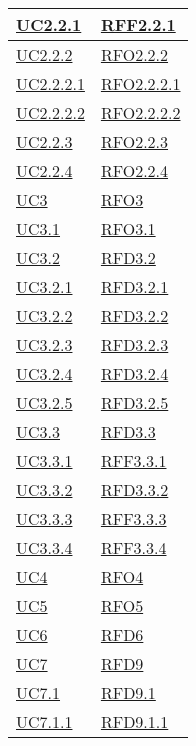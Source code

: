\begin{longtable}{|>{\centering}m{5cm}|m{5cm}<{\centering}|}
\hyperref[UC2.2.1]{UC2.2.1} & \hyperlink{RFF2.2.1}{RFF2.2.1}\\ \hline
\hyperref[UC2.2.2]{UC2.2.2} & \hyperlink{RFO2.2.2}{RFO2.2.2}\\ \hline
\hyperref[UC2.2.2.1]{UC2.2.2.1} & \hyperlink{RFO2.2.2.1}{RFO2.2.2.1}\\ \hline
\hyperref[UC2.2.2.2]{UC2.2.2.2} & \hyperlink{RFO2.2.2.2}{RFO2.2.2.2}\\ \hline
\hyperref[UC2.2.3]{UC2.2.3} & \hyperlink{RFO2.2.3}{RFO2.2.3}\\ \hline
\hyperref[UC2.2.4]{UC2.2.4} & \hyperlink{RFO2.2.4}{RFO2.2.4}\\ \hline
\hyperref[UC3]{UC3} & \hyperlink{RFO3}{RFO3}\\ \hline
\hyperref[UC3.1]{UC3.1} & \hyperlink{RFO3.1}{RFO3.1}\\ \hline
\hyperref[UC3.2]{UC3.2} & \hyperlink{RFD3.2}{RFD3.2}\\ \hline
\hyperref[UC3.2.1]{UC3.2.1} & \hyperlink{RFD3.2.1}{RFD3.2.1}\\ \hline
\hyperref[UC3.2.2]{UC3.2.2} & \hyperlink{RFD3.2.2}{RFD3.2.2}\\ \hline
\hyperref[UC3.2.3]{UC3.2.3} & \hyperlink{RFD3.2.3}{RFD3.2.3}\\ \hline
\hyperref[UC3.2.4]{UC3.2.4} & \hyperlink{RFD3.2.4}{RFD3.2.4}\\ \hline
\hyperref[UC3.2.5]{UC3.2.5} & \hyperlink{RFD3.2.5}{RFD3.2.5}\\ \hline
\hyperref[UC3.3]{UC3.3} & \hyperlink{RFD3.3}{RFD3.3}\\ \hline
\hyperref[UC3.3.1]{UC3.3.1} & \hyperlink{RFF3.3.1}{RFF3.3.1}\\ \hline
\hyperref[UC3.3.2]{UC3.3.2} & \hyperlink{RFD3.3.2}{RFD3.3.2}\\ \hline
\hyperref[UC3.3.3]{UC3.3.3} & \hyperlink{RFF3.3.3}{RFF3.3.3}\\ \hline
\hyperref[UC3.3.4]{UC3.3.4} & \hyperlink{RFF3.3.4}{RFF3.3.4}\\ \hline
\hyperref[UC4]{UC4} & \hyperlink{RFO4}{RFO4}\\ \hline
\hyperref[UC5]{UC5} & \hyperlink{RFO5}{RFO5}\\ \hline
\hyperref[UC6]{UC6} & \hyperlink{RFD6}{RFD6}\\ \hline
\hyperref[UC7]{UC7} & \hyperlink{RFD9}{RFD9}\\ \hline
\hyperref[UC7.1]{UC7.1} & \hyperlink{RFD9.1}{RFD9.1}\\ \hline
\hyperref[UC7.1.1]{UC7.1.1} & \hyperlink{RFD9.1.1}{RFD9.1.1}\\ \hline

\end{longtable}
